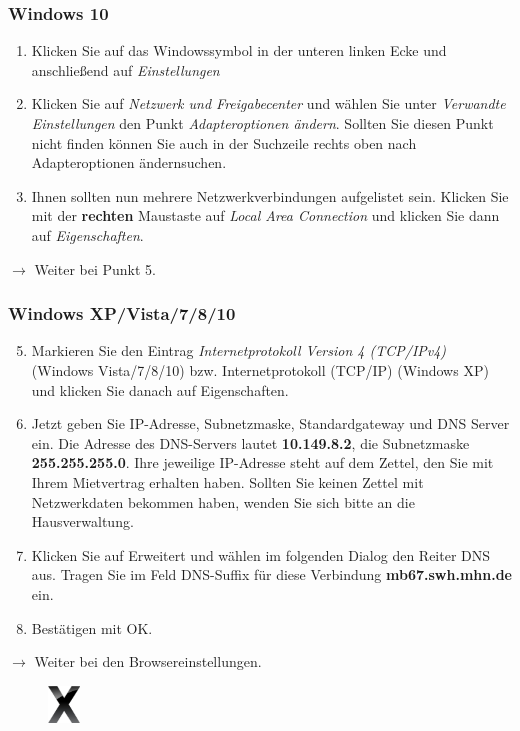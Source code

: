 \documentclass[a4paper,12pt]{scrartcl}
\begin{document}
\subsubsection*{Windows 10}
\begin{enumerate}
	\item Klicken Sie auf das Windowssymbol in der unteren linken Ecke und anschließend auf \emph{Einstellungen}
	\item Klicken Sie auf \textit{Netzwerk und Freigabecenter} und wählen Sie unter \textit{Verwandte Einstellungen} den Punkt \textit{Adapteroptionen ändern}. Sollten Sie diesen Punkt nicht finden können Sie auch in der Suchzeile rechts oben nach \glqq Adapteroptionen ändern\grqq suchen.
    \item Ihnen sollten nun mehrere Netzwerkverbindungen aufgelistet sein. Klicken Sie mit der \textbf{rechten} Maustaste auf \textit{Local Area Connection} und klicken Sie dann auf \textit{Eigenschaften}.
\end{enumerate}
$\rightarrow$ Weiter bei Punkt 5.

\subsubsection*{Windows XP/Vista/7/8/10}
\begin{enumerate}
    \setcounter{enumi}{4}
    \item Markieren Sie den Eintrag \textit{Internetprotokoll Version 4 (TCP/IPv4)} (Windows Vista/7/8/10) bzw. Internetprotokoll  (TCP/IP) (Windows XP) und klicken Sie danach auf Eigenschaften.
    \item Jetzt geben Sie IP-Adresse, Subnetzmaske, Standardgateway und DNS Server ein. Die Adresse des DNS-Servers lautet \textbf{10.149.8.2}, die Subnetzmaske \textbf{255.255.255.0}. Ihre jeweilige IP-Adresse steht auf dem Zettel, den Sie mit Ihrem Mietvertrag erhalten haben. Sollten Sie keinen Zettel mit Netzwerkdaten bekommen haben, wenden Sie sich bitte an die Hausverwaltung.
    \item Klicken Sie auf Erweitert und wählen im folgenden Dialog den Reiter DNS aus. Tragen Sie im Feld DNS-Suffix für diese Verbindung \textbf{mb67.swh.mhn.de} ein.
    \item Bestätigen mit OK.
\end{enumerate}
$\rightarrow$ Weiter bei den Browsereinstellungen.



\pagebreak

\begin{figure}[t!]
    \raggedleft
    \vspace{-20pt}
    \includegraphics[height=1cm,keepaspectratio]{Bilder/OSXLeopard}
    \vspace{-30pt}
\end{figure}
\end{document}
